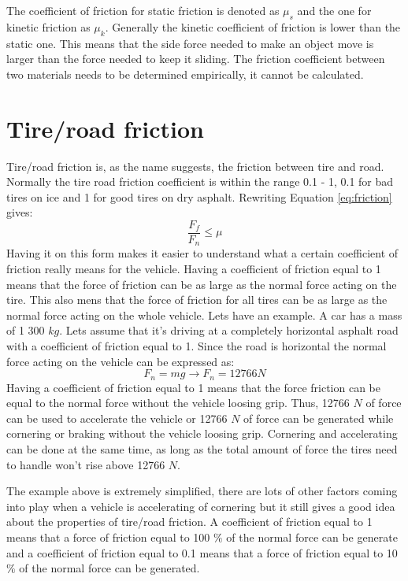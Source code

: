 The coefficient of friction for static friction is denoted as $ \mu_{s} $ and the one for kinetic friction as $ \mu_{k} $. Generally the kinetic coefficient of friction is lower than the static one. This means that the side force needed to make an object move is larger than the force needed to keep it sliding. The friction coefficient between two materials needs to be determined empirically, it cannot be calculated. 

\section{Tire/road friction}
Tire/road friction is, as the name suggests, the friction between tire and road. Normally the tire road friction coefficient is within the range 0.1 - 1, 0.1 for bad tires on ice and 1 for good tires on dry asphalt. Rewriting Equation \ref{eq:friction} gives:
\begin{equation} \label{eq:friction2}
\frac{F_{f}}{F_{n}} \leq\mu
\end{equation}
Having it on this form makes it easier to understand what a certain coefficient of friction really means for the vehicle. Having a coefficient of friction equal to 1 means that the force of friction can be as large as the normal force acting on the tire. This also mens that the force of friction for all tires can be as large as the normal force acting on the whole vehicle. Lets have an example. A car has a mass of 1 300 $ kg $. Lets assume that it's driving at a completely horizontal asphalt road with a coefficient of friction equal to 1. Since the road is horizontal the normal force acting on the vehicle can be expressed as:
\begin{equation} \label{eq:friction3}
F_{n}=mg \rightarrow F_{n} = 12766 N 
\end{equation}
Having a coefficient of friction equal to 1 means that the force friction can be equal to the normal force without the vehicle loosing grip. Thus, 12766 $ N $ of force can be used to accelerate the vehicle or 12766 $ N $ of force can be generated while cornering or braking without the vehicle loosing grip. Cornering and accelerating can be done at the same time, as long as the total amount of force the tires need to handle won't rise above 12766 $ N $.

The example above is extremely simplified, there are lots of other factors coming into play when a vehicle is accelerating of cornering but it still gives a good idea about the properties of tire/road friction. A coefficient of friction equal to 1 means that a force of friction equal to 100 $ \% $ of the normal force can be generate and a coefficient of friction equal to 0.1 means that a force of friction equal to 10 $ \% $ of the normal force can be generated.

